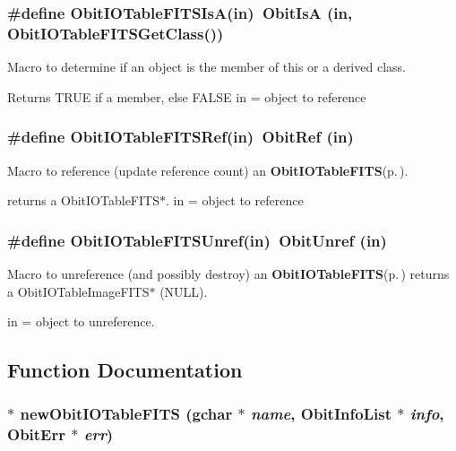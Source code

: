 \subsubsection{\setlength{\rightskip}{0pt plus 5cm}\#define Obit\-IOTable\-FITSIs\-A(in)\ Obit\-Is\-A (in, Obit\-IOTable\-FITSGet\-Class())}\label{ObitIOTableFITS_8h_a2}


Macro to determine if an object is the member of this or a derived class. 

Returns TRUE if a member, else FALSE in = object to reference 
\subsubsection{\setlength{\rightskip}{0pt plus 5cm}\#define Obit\-IOTable\-FITSRef(in)\ Obit\-Ref (in)}\label{ObitIOTableFITS_8h_a1}


Macro to reference (update reference count) an {\bf Obit\-IOTable\-FITS}{\rm (p.\,\pageref{structObitIOTableFITS})}. 

returns a Obit\-IOTable\-FITS$\ast$. in = object to reference 
\subsubsection{\setlength{\rightskip}{0pt plus 5cm}\#define Obit\-IOTable\-FITSUnref(in)\ Obit\-Unref (in)}\label{ObitIOTableFITS_8h_a0}


Macro to unreference (and possibly destroy) an {\bf Obit\-IOTable\-FITS}{\rm (p.\,\pageref{structObitIOTableFITS})} returns a Obit\-IOTable\-Image\-FITS$\ast$ (NULL). 

in = object to unreference. 

\subsection{Function Documentation}
\subsubsection{$\ast$ new\-Obit\-IOTable\-FITS (gchar $\ast$ {\em name}, {\bf Obit\-Info\-List} $\ast$ {\em info}, {\bf Obit\-Err} $\ast$ {\em err})}\label{ObitIOTableFITS_8h_a4}


